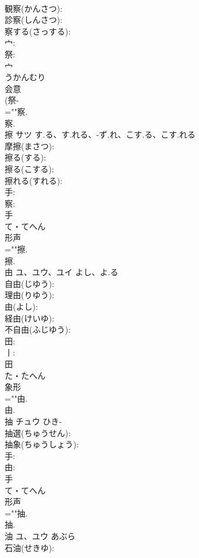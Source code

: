 \documentclass[8pt]{extreport}
\begin{document}
\begin{CJK}{UTF8}{min}
\\	観察(かんさつ): 
\\	診察(しんさつ): 
\\	察する(さっする): 
\\	宀: 
\\	祭: 
\\	宀	
\\	うかんむり	
\\	会意 
\\	(祭-
\\	=""察.
\\	察.
\\	擦	サツ	す.る、す.れる、-ず.れ、こす.る、こす.れる		
\\	摩擦(まさつ): 
\\	擦る(する): 
\\	擦る(こする): 
\\	擦れる(すれる): 
\\	手: 
\\	察: 
\\	手	
\\	て・てへん	
\\	形声 
\\	=""擦.
\\	擦.
\\	由	ユ、ユウ、ユイ	よし、よ.る		
\\	自由(じゆう): 
\\	理由(りゆう): 
\\	由(よし): 
\\	経由(けいゆ): 
\\	不自由(ふじゆう): 
\\	田: 
\\	丨: 
\\	田	
\\	た・たへん	
\\	象形 
\\	=""由.
\\	由.
\\	抽	チュウ	ひき-		
\\	抽選(ちゅうせん): 
\\	抽象(ちゅうしょう): 
\\	手: 
\\	由: 
\\	手	
\\	て・てへん	
\\	形声 
\\	=""抽.
\\	抽.
\\	油	ユ、ユウ	あぶら		
\\	石油(せきゆ): 

\end{CJK}
\end{document}
